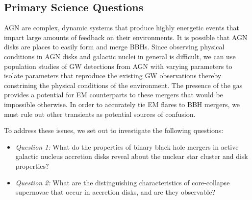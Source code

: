 \subsection{Primary Science Questions}

AGN are complex, dynamic systems that produce highly energetic events that impart large amounts of feedback on their environments.
It is possible that AGN disks are places to easily form and merge BBHs.
Since observing physical conditions in AGN disks and galactic nuclei in general is difficult, we can use population studies of GW detections from AGN with varying parameters to isolate parameters that reproduce the existing GW observations thereby constrining the physical conditions of the environment.
The presence of the gas provides a potential for EM counterparts to these mergers that would be impossible otherwise.
In order to accurately tie EM flares to BBH mergers, we must rule out other transients as potential sources of confusion.

\noindent To address these issues, we set out to investigate the following questions:

\begin{itemize}
\item \emph{Question 1:} What do the properties of binary black hole mergers in active galactic nucleus accretion disks reveal about the nuclear star cluster and disk properties?

\item \emph{Question 2:} What are the distinguishing characteristics of core-collapse supernovae that occur in accretion disks, and are they observable?
\end{itemize}
